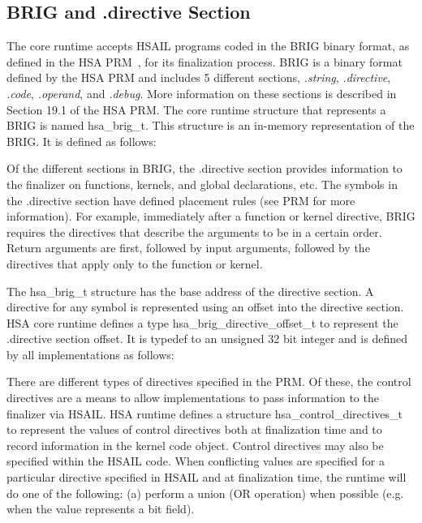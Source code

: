 \documentclass[draft]{book}
\newcommand{\reftyp}[1]{#1}
\begin{document}
\begin{appendices}
\subsection{BRIG and .directive Section}
The core runtime accepts HSAIL programs coded in the BRIG binary format, as
defined in the HSA PRM~\cite{prm}, for its finalization process. BRIG is a
binary format defined by the HSA PRM and includes 5 different sections,
\emph{.string}, \emph{.directive}, \emph{.code}, \emph{.operand}, and
\emph{.debug}. More information on these sections is described in Section 19.1
of the HSA PRM. The core runtime structure that represents a BRIG is named
\reftyp{hsa_brig_t}. This structure is an in-memory representation of the
BRIG. It is defined as follows:



Of the different sections in BRIG, the .directive section provides information
to the finalizer on functions, kernels, and global declarations, etc. The
symbols in the .directive section have defined placement rules (see PRM for more
information). For example, immediately after a function or kernel directive,
BRIG requires the directives that describe the arguments to be in a certain
order. Return arguments are first, followed by input arguments, followed by the
directives that apply only to the function or kernel.

The \reftyp{hsa_brig_t} structure has the base address of the directive
section. A directive for any symbol is represented using an offset into the
directive section. HSA core runtime defines a type
\reftyp{hsa_brig_directive_offset_t} to represent the .directive section
offset. It is typedef to an unsigned 32 bit integer and is defined by all
implementations as follows:



There are different types of directives specified in the PRM. Of these, the
control directives are a means to allow implementations to pass information to
the finalizer via HSAIL. HSA runtime defines a structure
\reftyp{hsa_control_directives_t} to represent the values of control
directives both at finalization time and to record information in the kernel
code object. Control directives may also be specified within the HSAIL
code. When conflicting values are specified for a particular directive specified
in HSAIL and at finalization time, the runtime will do one of the following: (a)
perform a union (OR operation) when possible (e.g. when the value represents a
bit field).


\end{appendices}
\end{document}
